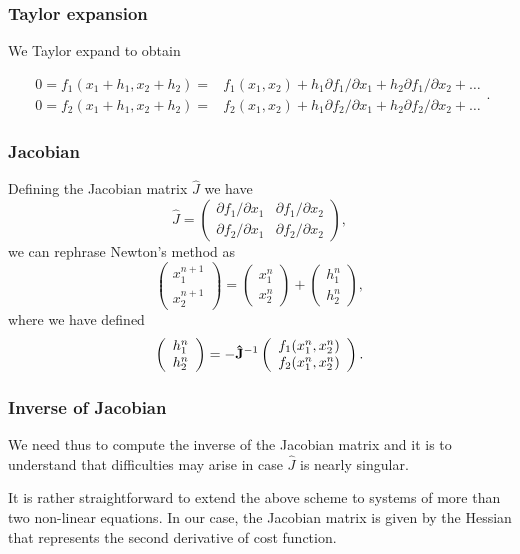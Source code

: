 \documentclass{beamer}
\begin{document}
\begin{frame}
\frametitle{Taylor expansion}

We Taylor expand to obtain

\[
   \begin{array}{cc} 0=f_1(x_1+h_1,x_2+h_2)=&f_1(x_1,x_2)+h_1
                     \partial f_1/\partial x_1+h_2
                     \partial f_1/\partial x_2+\dots\\
                     0=f_2(x_1+h_1,x_2+h_2)=&f_2(x_1,x_2)+h_1
                     \partial f_2/\partial x_1+h_2
                     \partial f_2/\partial x_2+\dots
                       \end{array}.
\]
\end{frame}

\begin{frame}
\frametitle{Jacobian}

Defining the Jacobian matrix $\hat{J}$ we have
\[
 \hat{J}=\left( \begin{array}{cc}
                         \partial f_1/\partial x_1  & \partial f_1/\partial x_2 \\
                          \partial f_2/\partial x_1     &\partial f_2/\partial x_2
             \end{array} \right),
\]
we can rephrase Newton's method as
\[
\left(\begin{array}{c} x_1^{n+1} \\ x_2^{n+1} \end{array} \right)=
\left(\begin{array}{c} x_1^{n} \\ x_2^{n} \end{array} \right)+
\left(\begin{array}{c} h_1^{n} \\ h_2^{n} \end{array} \right),
\]
where we have defined
\[
   \left(\begin{array}{c} h_1^{n} \\ h_2^{n} \end{array} \right)=
   -{\bf \hat{J}}^{-1}
   \left(\begin{array}{c} f_1(x_1^{n},x_2^{n}) \\ f_2(x_1^{n},x_2^{n}) \end{array} \right).
\]
\end{frame}

\begin{frame}
\frametitle{Inverse of Jacobian}

We need thus to compute the inverse of the Jacobian matrix and it
is to understand that difficulties  may
arise in case $\hat{J}$ is nearly singular.

It is rather straightforward to extend the above scheme to systems of
more than two non-linear equations. In our case, the Jacobian matrix is given by the Hessian that represents the second derivative of cost function.
\end{frame}
\end{document}
